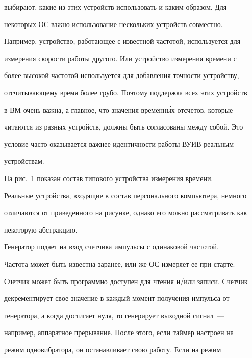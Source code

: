 выбирают, какие из этих устройств использовать и каким образом. Для 


некоторых ОС важно использование нескольких устройств совместно. 


Например, устройство, работающее с известной частотой, используется для 


измерения скорости работы другого. Или устройство измерения времени с 


более высокой частотой используется для добавления точности устройству, 


отсчитывающему время более грубо. Поэтому поддержка всех этих устройств 


в ВМ очень важна, а главное, что значения временн\'{ы}х отсчетов, которые 


читаются из разных устройств, должны быть согласованы между собой. Это 


условие час\-то оказывается важнее идентичности работы ВУИВ реальным 


устройствам.


     





     


     На рис.~1 показан состав типового устройства измерения времени. 


Реальные устройства, входящие в состав персонального компьютера, немного 


отличаются от приведенного на рисунке, однако его можно рассматривать как 


некоторую абстракцию.


     


     


     Генератор подает на вход счетчика импульсы с одинаковой частотой. 


Частота может быть известна заранее, или же ОС измеряет ее при старте. 


Счетчик может быть программно доступен для чтения и/\!или записи. Счетчик 


декрементирует свое значение в каждый момент получения импульса от 


генератора, а когда достигает нуля, то генерирует выходной сигнал~--- 


например, аппаратное прерывание. После этого, если таймер настроен на 


режим одновибратора, он останавливает свою работу. Если на режим 


